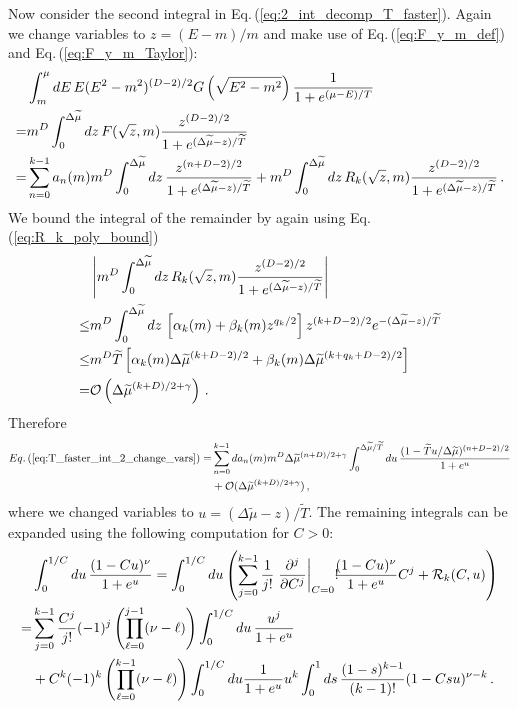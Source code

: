 \documentclass[sn-mathphys,Numbered]{sn-jnl}
\newcommand{\req}[1]{Eq.\,(\ref{#1})}
\begin{document}
Now consider the second integral in \req{eq:2_int_decomp_T_faster}. Again we change variables to $z=(E-m)/m$ and make use of \req{eq:F_y_m_def} and \req{eq:F_y_m_Taylor}:
\begin{align}\label{eq:T_faster_int_2_change_vars} 
 &\int_m^{\mu} dE \,E(E^2-m^2)^{(D-2)/2} G\left(\sqrt{E^2-m^2}\right)\frac{1}{1+e^{(\mu-E)/T}} \\\notag
 =&m^{D}\int_0^{\Delta\widetilde{\mu}} dz \, F(\sqrt{z},m)\frac{z^{(D-2)/2}}{1+e^{(\Delta\widetilde{\mu}-z)/\widetilde{T}}}\notag\\
 =&\sum_{n=0}^{k-1} a_n(m)m^{D}\int_0^{\Delta\widetilde{\mu}} dz \,\frac{z^{(n+D-2)/2}}{1+e^{(\Delta\widetilde{\mu}-z)/\widetilde{T}}} +m^{D}\int_0^{\Delta\widetilde{\mu}} dz \,R_k(\sqrt{z},m)
\frac{z^{(D-2)/2}}{1+e^{(\Delta\widetilde{\mu}-z)/\widetilde{T}}}\notag\,.
\end{align}
We bound the integral of the remainder by again using \req{eq:R_k_poly_bound}
\begin{align}
 &\left|m^{D}\int_0^{\Delta\widetilde{\mu}} dz \,R_k(\sqrt{z},m)
\frac{z^{(D-2)/2}}{1+e^{(\Delta\widetilde{\mu}-z)/\widetilde{T}}}\right|\\
\leq&m^{D}\int_0^{\Delta\widetilde{\mu}} dz \,\left[\alpha_k(m)+\beta_k(m)z^{q_k/2}\right]z^{(k+D-2)/2}e^{-(\Delta\widetilde{\mu}-z)/\widetilde{T}}\notag\\
\leq &m^{D}\widetilde{T}\left[\alpha_k(m)\Delta\widetilde{\mu}^{(k+D-2)/2}+\beta_k(m)\Delta\widetilde{\mu}^{(k+q_k+D-2)/2}\right]\notag\\
=&\mathcal{O}\left(\Delta\widetilde{\mu}^{(k+D)/2+\gamma}\right)\,.\notag
\end{align}
Therefore 
\begin{align} \label{eq:T_faster_int_2_expanded1}
 \req{eq:T_faster_int_2_change_vars} =&\sum_{n=0}^{k-1} da_n(m)m^{D}\Delta\widetilde{\mu}^{(n+D)/2+\gamma}\int^{\Delta\widetilde{\mu}/\widetilde{T}}_{0} du \,\frac{(1-\widetilde{T}u/\Delta\widetilde{\mu})^{(n+D-2)/2}}{1+e^{u}} \\
 &+\mathcal{O}(\Delta\widetilde{\mu}^{(k+D)/2+\gamma})\notag\,,
\end{align}
where we changed variables to $u=(\Delta\widetilde{\mu}-z)/\widetilde{T}$. The remaining integrals can be expanded using the following computation for $C>0$: 
\begin{align}
&\int_0^{1/C} du \,\frac{(1-Cu)^\nu}{1+e^u} = \int_0^{1/C} du\left(\sum_{j=0}^{k-1} \frac{1}{j!} \left. \frac{\partial^j}{\partial C^j}\right|_{C=0}!\!\!\frac{(1-Cu)^\nu}{1 + e^u} C^j + \mathcal{R}_k(C,u)\right)\\
=&\sum_{j=0}^{k-1}\frac{C^j}{j!}(-1)^j\left(\prod_{\ell=0}^{j-1}(\nu-\ell) \right)\int_0^{1/C} du \,\frac{u^j}{1+e^u} \notag\\
&+ C^k (-1)^k\left(\prod_{\ell=0}^{k-1}(\nu-\ell)\right)\int_0^{1/C} du \frac{1}{1+e^u} u^k\int_0^1ds\,\frac{(1-s)^{k-1}}{(k-1)!} (1-Csu)^{\nu-k}\,.\notag
\end{align}
\end{document}
